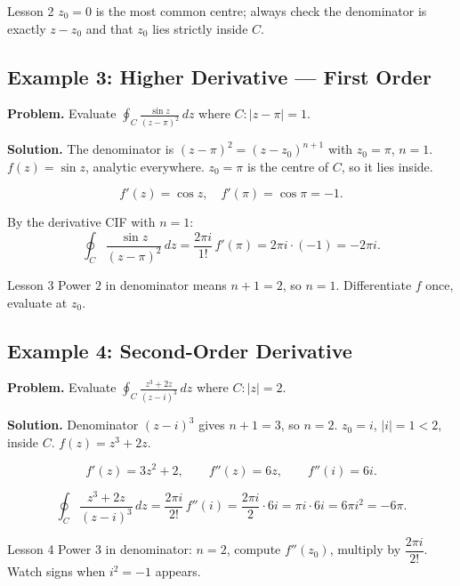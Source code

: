 \documentclass[12pt,a4paper]{article}
\begin{document}
\begin{learnbox}{Lesson 2}
$z_0 = 0$ is the most common centre; always check the denominator is exactly
$z - z_0$ and that $z_0$ lies strictly inside $C$.
\end{learnbox}

\subsection*{Example 3: Higher Derivative --- First Order}

\textbf{Problem.} Evaluate $\displaystyle\oint_{C} \frac{\sin z}{(z - \pi)^2}\,dz$
where $C: |z - \pi| = 1$.

\textbf{Solution.}
The denominator is $(z - \pi)^2 = (z - z_0)^{n+1}$ with $z_0 = \pi$, $n = 1$.
$f(z) = \sin z$, analytic everywhere. $z_0 = \pi$ is the centre of $C$, so it lies inside.

\[
  f'(z) = \cos z, \quad f'(\pi) = \cos\pi = -1.
\]

By the derivative CIF with $n = 1$:
\[
  \oint_{C} \frac{\sin z}{(z-\pi)^2}\,dz = \frac{2\pi i}{1!}\,f'(\pi) = 2\pi i\cdot(-1) = -2\pi i.
\]

\begin{learnbox}{Lesson 3}
Power $2$ in denominator means $n+1=2$, so $n=1$. Differentiate $f$ once, evaluate at $z_0$.
\end{learnbox}

\subsection*{Example 4: Second-Order Derivative}

\textbf{Problem.} Evaluate $\displaystyle\oint_{C} \frac{z^3 + 2z}{(z - i)^3}\,dz$
where $C: |z| = 2$.

\textbf{Solution.}
Denominator $(z-i)^3$ gives $n+1 = 3$, so $n = 2$. $z_0 = i$, $|i| = 1 < 2$, inside $C$.
$f(z) = z^3 + 2z$.

\[
  f'(z) = 3z^2 + 2, \qquad f''(z) = 6z, \qquad f''(i) = 6i.
\]

\[
  \oint_{C} \frac{z^3+2z}{(z-i)^3}\,dz = \frac{2\pi i}{2!}\,f''(i) = \frac{2\pi i}{2}\cdot 6i
  = \pi i \cdot 6i = 6\pi i^2 = -6\pi.
\]

\begin{learnbox}{Lesson 4}
Power $3$ in denominator: $n=2$, compute $f''(z_0)$, multiply by $\dfrac{2\pi i}{2!}$.
Watch signs when $i^2 = -1$ appears.
\end{learnbox}
\end{document}

